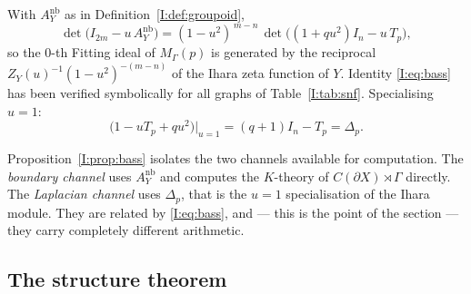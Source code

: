 \begin{proposition}\label{I:prop:bass}
With $A^{\mathrm{nb}}_Y$ as in Definition~\ref{I:def:groupoid},
\begin{equation}\label{I:eq:bass}
\det\bigl(I_{2m}-u\,A^{\mathrm{nb}}_Y\bigr)
=(1-u^2)^{\,m-n}\,\det\bigl((1+qu^2)I_n-u\,T_p\bigr),
\end{equation}
so the $0$-th Fitting ideal of $M_\Gamma(p)$ is generated by the reciprocal
$Z_Y(u)^{-1}(1-u^2)^{-(m-n)}$ of the Ihara zeta function of $Y$. Identity
\eqref{I:eq:bass} has been verified symbolically for all graphs of
Table~\ref{I:tab:snf}. Specialising $u=1$:
\[
\bigl(1-uT_p+qu^2\bigr)\big|_{u=1}=(q+1)I_n-T_p=\Delta_p .
\]
\end{proposition}

Proposition~\ref{I:prop:bass} isolates the two channels available for computation. The
\emph{boundary channel} uses $A^{\mathrm{nb}}_Y$ and computes the $K$-theory of
$C(\partial X)\rtimes\Gamma$ directly. The \emph{Laplacian channel} uses $\Delta_p$, that
is the $u=1$ specialisation of the Ihara module. They are related by \eqref{I:eq:bass},
and --- this is the point of the section --- they carry completely different arithmetic.

\subsection{The structure theorem}

